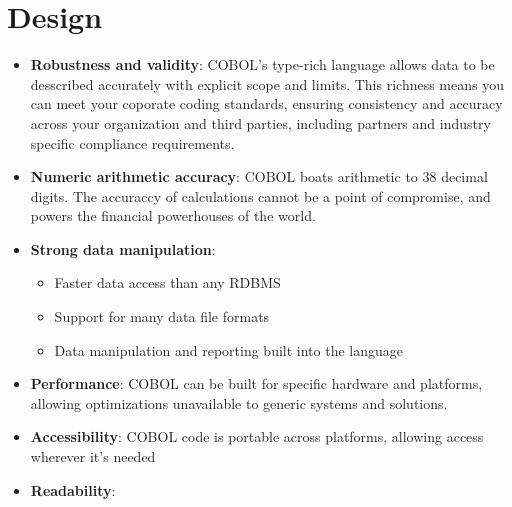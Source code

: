 \documentclass[12pt]{article}
\begin{document}
\begin{itemize}

\end{itemize}



\section{Design}

\begin{itemize}

    \item \textbf{Robustness and validity}: COBOL's type-rich language allows data to be desscribed accurately with explicit scope and limits. This richness means you can meet your coporate coding standards, ensuring consistency and accuracy across your organization and third parties, including partners and industry specific compliance requirements.
    \item \textbf{Numeric arithmetic accuracy}: COBOL boats arithmetic to 38 decimal digits. The accuraccy of calculations cannot be a point of compromise, and powers the financial powerhouses of the world.
    \item \textbf{Strong data manipulation}:
    \begin{itemize}
        \item Faster data access than any RDBMS
        \item Support for many data file formats
        \item Data manipulation and reporting built into the language
    \end{itemize}
    \item \textbf{Performance}: COBOL can be built for specific hardware and platforms, allowing optimizations unavailable to generic systems and solutions.
    \item \textbf{Accessibility}: COBOL code is portable across platforms, allowing access wherever it's needed
    \item \textbf{Readability}: 

\end{itemize}
\end{document}
